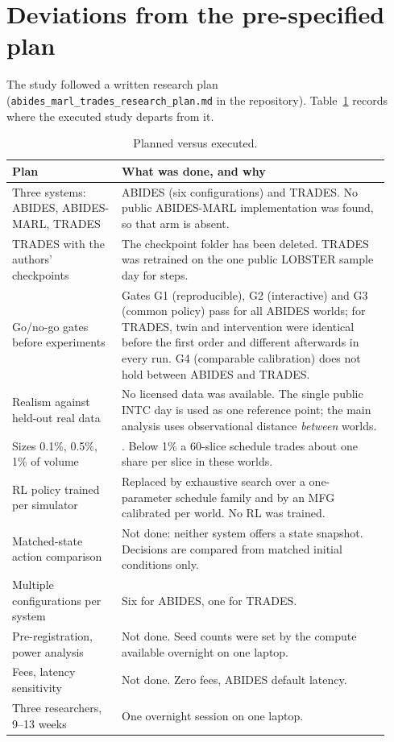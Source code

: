 \section{Deviations from the pre-specified plan}
\label{app:deviations}

The study followed a written research plan (\texttt{abides\_marl\_trades\_research\_plan.md} in the repository). Table~\ref{tab:deviations} records where the executed study departs from it.

\begin{table}[H]
\centering\footnotesize
\caption{Planned versus executed.}\label{tab:deviations}
\begin{tabular}{p{0.27\linewidth}p{0.66\linewidth}}
\toprule
Plan & What was done, and why \\
\midrule
Three systems: ABIDES, ABIDES-MARL, TRADES & ABIDES (six configurations) and TRADES. No public ABIDES-MARL implementation was found, so that arm is absent. \\
TRADES with the authors' checkpoints & The checkpoint folder has been deleted. TRADES was retrained on the one public LOBSTER sample day for \tradesSteps{} steps. \\
Go/no-go gates before experiments & Gates G1 (reproducible), G2 (interactive) and G3 (common policy) pass for all ABIDES worlds; for TRADES, twin and intervention were identical before the first order and different afterwards in every run. G4 (comparable calibration) does not hold between ABIDES and TRADES. \\
Realism against held-out real data & No licensed data was available. The single public INTC day is used as one reference point; the main analysis uses observational distance \emph{between} worlds. \\
Sizes 0.1\%, 0.5\%, 1\% of volume & \sizesText{}. Below 1\% a 60-slice schedule trades about one share per slice in these worlds. \\
RL policy trained per simulator & Replaced by exhaustive search over a one-parameter schedule family and by an MFG calibrated per world. No RL was trained. \\
Matched-state action comparison & Not done: neither system offers a state snapshot. Decisions are compared from matched initial conditions only. \\
Multiple configurations per system & Six for ABIDES, one for TRADES. \\
Pre-registration, power analysis & Not done. Seed counts were set by the compute available overnight on one laptop. \\
Fees, latency sensitivity & Not done. Zero fees, ABIDES default latency. \\
Three researchers, 9--13 weeks & One overnight session on one laptop. \\
\bottomrule
\end{tabular}
\end{table}

